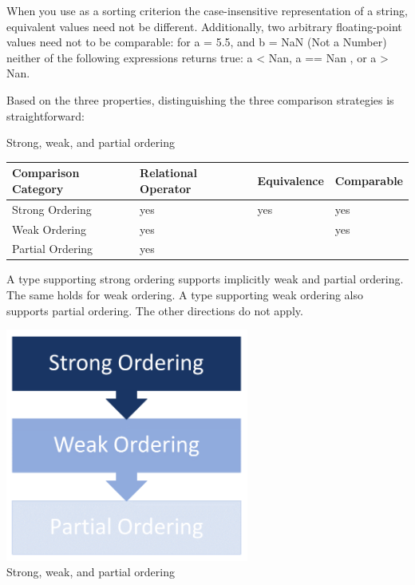 When you use as a sorting criterion the case-insensitive representation of a string, equivalent values need not be different. Additionally, two arbitrary floating-point values need not to be comparable: for a = 5.5, and b = NaN (Not a Number) neither of the following expressions returns true: a < Nan, a == Nan , or a > Nan.

Based on the three properties, distinguishing the three comparison strategies is straightforward:

\begin{center}
Strong, weak, and partial ordering
\end{center}

\begin{table}[H]
\centering
\begin{tabular}{llll}
Comparison Category & Relational Operator & Equivalence & Comparable \\ \hline
Strong Ordering     & yes                 & yes         & yes        \\
Weak Ordering       & yes                 &             & yes        \\
Partial Ordering    & yes                 &             &           
\end{tabular}
\end{table}


A type supporting strong ordering supports implicitly weak and partial ordering. The same holds for weak ordering. A type supporting weak ordering also supports partial ordering. The other directions do not apply.

\begin{center}
\includegraphics[width=0.6\textwidth]{content/3/chapter4/images/29.png}\\
Strong, weak, and partial ordering
\end{center}

